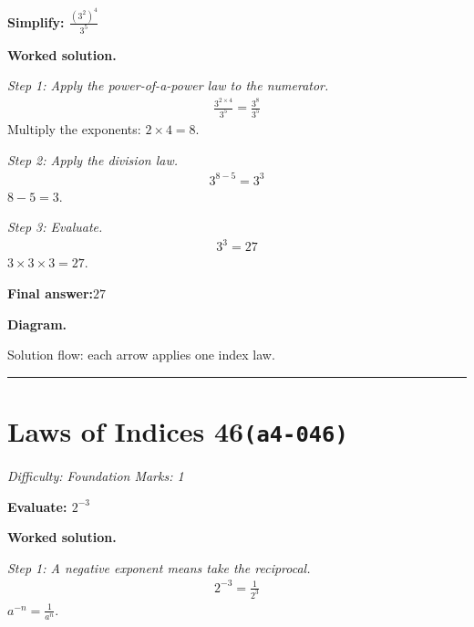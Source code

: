 \documentclass[11pt]{article}
\newcommand{\question}[1]{\par\medskip\noindent\textbf{#1}\par}
\begin{document}
\question{Simplify: \( \frac{(3^2)^4}{3^5} \)}

\textbf{Worked solution.}

\textit{Step 1: Apply the power-of-a-power law to the numerator.}
\[\begin{gathered}
\frac{3^{2 \times 4}}{3^5} = \frac{3^8}{3^5}
\end{gathered}\]
Multiply the exponents: \( 2 \times 4 = 8 \).

\textit{Step 2: Apply the division law.}
\[\begin{gathered}
3^{8-5} = 3^3
\end{gathered}\]
\( 8 - 5 = 3 \).

\textit{Step 3: Evaluate.}
\[\begin{gathered}
3^3 = 27
\end{gathered}\]
\( 3 \times 3 \times 3 = 27 \).

\begin{answerbox}
\textbf{Final answer:}\quad \(\displaystyle 27\)
\end{answerbox}
\textbf{Diagram.}

\begin{center}
\end{center}
\small Solution flow: each arrow applies one index law.\normalsize

\medskip\hrule

\section*{Laws of Indices 46\quad\small\texttt{(a4-046)}}
\textit{Difficulty: Foundation \quad\textbar\quad Marks: 1}

\question{Evaluate: \( 2^{-3} \)}

\textbf{Worked solution.}

\textit{Step 1: A negative exponent means take the reciprocal.}
\[\begin{gathered}
2^{-3} = \frac{1}{2^3}
\end{gathered}\]
\( a^{-n} = \frac{1}{a^n} \).
\end{document}
